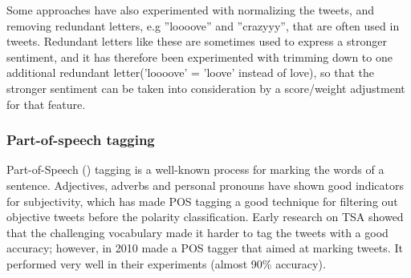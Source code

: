 Some approaches have also experimented with normalizing the tweets, and removing redundant letters, e.g ''loooove'' and ''crazyyy'', that are often used in tweets. Redundant letters like these are sometimes used to express a stronger sentiment, and it has therefore been experimented with trimming down to one additional redundant letter('loooove' = 'loove' instead of love), so that the stronger sentiment can be taken into consideration by a score/weight adjustment for that feature.

\subsubsection*{Part-of-speech tagging}
Part-of-Speech () tagging is a well-known process for marking the words of a sentence. Adjectives, adverbs and personal pronouns have shown good indicators for subjectivity, which has made POS tagging a good technique for filtering out objective tweets before the polarity classification. Early research on TSA showed that the challenging vocabulary made it harder to tag the tweets with a good accuracy; however, in 2010 \cite{article:gimpel} made a POS tagger that aimed at marking tweets. It performed very well in their experiments (almost 90\% accuracy).
